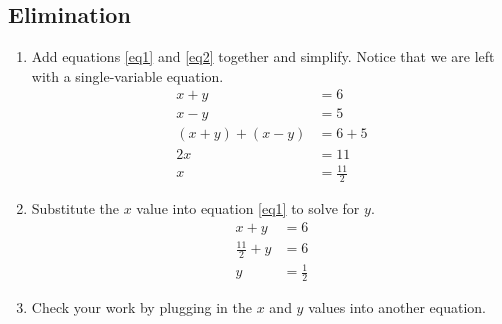 \documentclass{article}
\begin{document}
    \subsection*{Elimination}
    \begin{enumerate}
        \item Add equations \eqref{eq1} and \eqref{eq2} together and simplify. 
        Notice that we are left with a single-variable equation.
        \begin{align*}
            x + y &= 6 \nonumber \\
            x - y &= 5 \nonumber \\
            (x + y) + (x - y) &= 6 + 5 \\
            2x &= 11 \\
            x &= \frac{11}{2}
        \end{align*}
        \item Substitute the $x$ value into equation \eqref{eq1} to solve for $y$.
        \begin{align*}
            x + y &= 6 \\
            \frac{11}{2} + y &= 6 \\
            y &= \frac{1}{2}
        \end{align*}
        \item Check your work by plugging in the $x$ and $y$ values into another equation.
    \end{enumerate}
\end{document}
